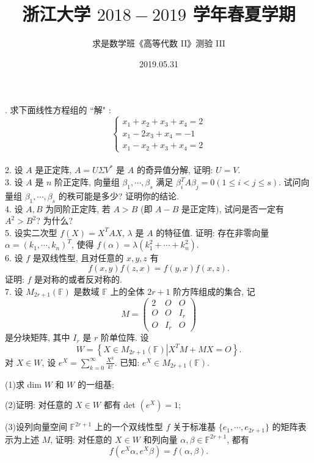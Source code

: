 \documentclass[UTF8]{ctexart}
\title{\LARGE \textbf{浙江大学 $2018-2019$ 学年春夏学期}}
\author{求是数学班《高等代数 II》测验 III}
\date{2019.05.31}
\begin{document}
. 求下面线性方程组的 ``解" :
\[
\begin{cases}
  x_1+x_2+x_3+x_4=2 \\
  x_1-2x_3+x_4=-1 \\
  x_1-x_2+x_3+x_4=2
\end{cases}
\]
\\

2. 设 $A$ 是正定阵, $A=U\Sigma V^*$ 是 $A$ 的奇异值分解, 证明: $U=V$.
\\

3. 设 $A$ 是 $n$ 阶正定阵, 向量组 $\beta_1,\cdots,\beta_s$ 满足 $\beta_i^TA\beta_j=0(1\leq i<j\leq s)$. 试问向量组 $\beta_1,\cdots,\beta_s$ 的秩可能是多少? 证明你的结论.
\\

4. 设 $A,B$ 为同阶正定阵, 若 $A>B$ (即 $A-B$ 是正定阵), 试问是否一定有 $A^2>B^2$? 为什么?
\\

5. 设实二次型 $f(X)=X^TAX$, $\lambda$ 是 $A$ 的特征值. 证明: 存在非零向量 $\alpha=(k_1,\cdots,k_n)^T$, 使得 $f(\alpha)=\lambda(k_1^2+\cdots+k_n^2)$.
\\

6. 设 $f$ 是双线性型, 且对任意的 $x,y,z$ 有
\[
f(x,y)f(z,x)=f(y,x)f(x,z).
\]
证明: $f$ 是对称的或者反对称的.
\\

7. 设 $M_{2r+1}(\mathbb{F})$ 是数域 $\mathbb{F}$ 上的全体 $2r+1$ 阶方阵组成的集合, 记
\[
M=\left(
\begin{array}{ccc}
  2 & O & O \\
  O & O & I_r \\
  O & I_r & O
\end{array}
\right)
\]
是分块矩阵, 其中 $I_r$ 是 $r$ 阶单位阵. 设
\[
W=\left\{X\in M_{2r+1}(\mathbb{F}) \left| X^TM+MX=O \right\}\right..
\]
对 $X\in W$, 设 $e^X=\displaystyle\sum\limits_{k=0}^{\infty}\frac{X^k}{k!}$. 已知: $e^X\in M_{2r+1}(\mathbb{F})$.

(1)求 dim $W$ 和 $W$ 的一组基;

(2)证明: 对任意的 $X\in W$ 都有 det $(e^X)=1$;

(3)设列向量空间 $\mathbb{F}^{2r+1}$ 上的一个双线性型 $f$ 关于标准基 $\{e_1,\cdots,e_{2r+1}\}$ 的矩阵表示为上述 $M$, 证明: 对任意的 $X\in W$ 和列向量 $\alpha,\beta\in\mathbb{F}^{2r+1}$, 都有
\[
f(e^X\alpha,e^X\beta)=f(\alpha,\beta).
\]
\end{document}
